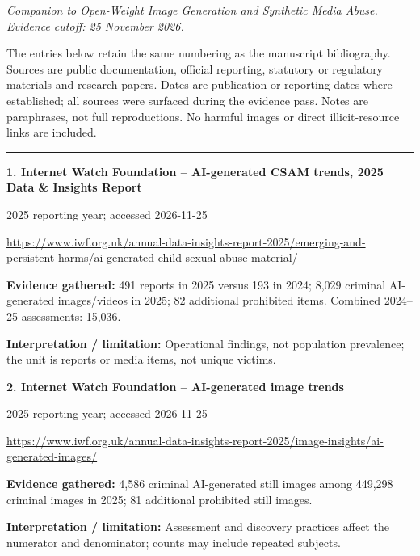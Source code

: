 \documentclass[11pt,a4paper]{article}
\begin{document}
\par\vspace{3mm}
\textit{Companion to Open-Weight Image Generation and Synthetic Media Abuse. Evidence cutoff: 25 November 2026.}\par
The entries below retain the same numbering as the manuscript bibliography. Sources are public documentation, official reporting, statutory or regulatory materials and research papers. Dates are publication or reporting dates where established; all sources were surfaced during the evidence pass. Notes are paraphrases, not full reproductions. No harmful images or direct illicit-resource links are included.\par\hrule\vspace{3mm}
\noindent\begin{minipage}{\linewidth}\textbf{1. Internet Watch Foundation -- AI-generated CSAM trends, 2025 Data \& Insights Report}\par{\small 2025 reporting year; accessed 2026-11-25\par\url{https://www.iwf.org.uk/annual-data-insights-report-2025/emerging-and-persistent-harms/ai-generated-child-sexual-abuse-material/}}\par
\textbf{Evidence gathered:} 491 reports in 2025 versus 193 in 2024; 8,029 criminal AI-generated images/videos in 2025; 82 additional prohibited items. Combined 2024--25 assessments: 15,036.\par\textbf{Interpretation / limitation:} Operational findings, not population prevalence; the unit is reports or media items, not unique victims.\par
\end{minipage}\par\vspace{2mm}
\noindent\begin{minipage}{\linewidth}\textbf{2. Internet Watch Foundation -- AI-generated image trends}\par{\small 2025 reporting year; accessed 2026-11-25\par\url{https://www.iwf.org.uk/annual-data-insights-report-2025/image-insights/ai-generated-images/}}\par
\textbf{Evidence gathered:} 4,586 criminal AI-generated still images among 449,298 criminal images in 2025; 81 additional prohibited still images.\par\textbf{Interpretation / limitation:} Assessment and discovery practices affect the numerator and denominator; counts may include repeated subjects.\par
\end{minipage}\par\vspace{2mm}
\end{document}
